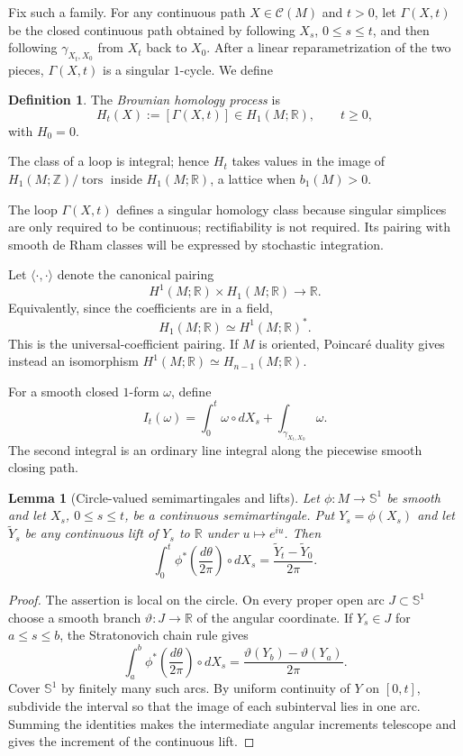 \documentclass[a4paper,reqno]{amsart}
\newcommand{\R}{\mathbb R}
\newcommand{\Z}{\mathbb Z}
\newcommand{\Sph}{\mathbb S}
\newcommand{\Ccal}{\mathcal C}
\newtheorem{lemma}[theorem]{Lemma}
\theoremstyle{definition}
\newtheorem{definition}[theorem]{Definition}
\begin{document}
Fix such a family.  For any continuous path $X\in\Ccal(M)$ and $t>0$, let $\Gamma(X,t)$ be the closed continuous path obtained by following $X_s$, $0\le s\le t$, and then following $\gamma_{X_t,X_0}$ from $X_t$ back to $X_0$.  After a linear reparametrization of the two pieces, $\Gamma(X,t)$ is a singular $1$-cycle.  We define
\begin{definition}\label{def:Ht}
The \emph{Brownian homology process} is
\[
   H_t(X):=[\Gamma(X,t)]\in H_1(M;\R),
   \qquad t\ge0,
\]
with $H_0=0$.
\end{definition}

The class of a loop is integral; hence $H_t$ takes values in the image of
$H_1(M;\Z)/\operatorname{tors}$ inside $H_1(M;\R)$, a lattice when
$b_1(M)>0$.

The loop $\Gamma(X,t)$ defines a singular homology class because singular simplices are only required to be continuous; rectifiability is not required.  Its pairing with smooth de Rham classes will be expressed by stochastic integration.

Let $\langle\cdot,\cdot\rangle$ denote the canonical pairing
\[
   H^1(M;\R)\times H_1(M;\R)\longrightarrow\R.
\]
Equivalently, since the coefficients are in a field,
\[
   H_1(M;\R)\simeq H^1(M;\R)^*.
\]
This is the universal-coefficient pairing.  If $M$ is oriented, Poincar\'e duality gives instead an isomorphism $H^1(M;\R)\simeq H_{n-1}(M;\R)$.

For a smooth closed $1$-form $\omega$, define
\begin{equation}\label{eq:stochpair}
   I_t(\omega)
   =\int_0^t\omega\circ dX_s
    +\int_{\gamma_{X_t,X_0}}\omega.
\end{equation}
The second integral is an ordinary line integral along the piecewise smooth closing path.

\begin{lemma}[Circle-valued semimartingales and lifts]\label{lem:circlelift}
Let $\phi:M\to\Sph^1$ be smooth and let $X_s$, $0\le s\le t$, be a continuous semimartingale.  Put $Y_s=\phi(X_s)$ and let $\widetilde Y_s$ be any continuous lift of $Y_s$ to $\R$ under $u\mapsto e^{iu}$.  Then
\[
 \int_0^t \phi^*\!\left(\frac{d\theta}{2\pi}\right)\circ dX_s
 =\frac{\widetilde Y_t-\widetilde Y_0}{2\pi}.
\]
\end{lemma}

\begin{proof}
The assertion is local on the circle.  On every proper open arc $J\subset\Sph^1$ choose a smooth branch $\vartheta:J\to\R$ of the angular coordinate.  If $Y_s\in J$ for $a\le s\le b$, the Stratonovich chain rule gives
\[
 \int_a^b \phi^*\!\left(\frac{d\theta}{2\pi}\right)\circ dX_s
 =\frac{\vartheta(Y_b)-\vartheta(Y_a)}{2\pi}.
\]
Cover $\Sph^1$ by finitely many such arcs.  By uniform continuity of $Y$ on $[0,t]$, subdivide the interval so that the image of each subinterval lies in one arc.  Summing the identities makes the intermediate angular increments telescope and gives the increment of the continuous lift.
\end{proof}
\end{document}
